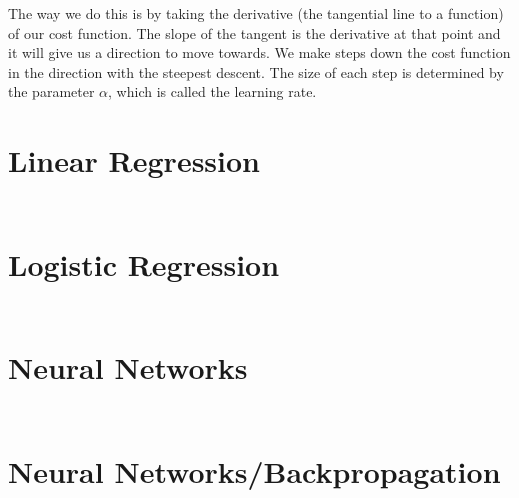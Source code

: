 \documentclass{article}
\begin{document}
            The way we do this is by taking the derivative (the tangential line to a function) of our cost function. 
            The slope of the tangent is the derivative at that point and it will give us a direction to move towards.
            We make steps down the cost function in the direction with the steepest descent. 
            The size of each step is determined by the parameter $\alpha$, which is called the learning rate.
            

    \section{Linear Regression}

        \begin{align}
            
        \end{align}

    \section{Logistic Regression}


        \begin{align}
            
        \end{align}

    \section{Neural Networks}


        \begin{align}
            
        \end{align}

    \section{Neural Networks/Backpropagation}

        \begin{align}
            
        \end{align}
\end{document}
